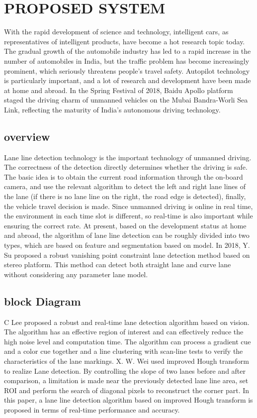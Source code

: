 \documentclass[oneside,a4paper,12pt]{report}
\begin{document}
\chapter{PROPOSED SYSTEM}
With the rapid development of science and technology, intelligent cars, as representatives of intelligent products, have become a hot research topic today. The gradual growth of the automobile industry has led to a rapid increase in the number of automobiles in India, but the traffic problem has become increasingly prominent, which seriously threatens people's travel safety. Autopilot technology is particularly important, and a lot of research and development have been made at home and abroad. In the Spring Festival of 2018, Baidu Apollo platform staged the driving charm of unmanned vehicles on the Mubai Bandra-Worli Sea Link, reflecting the maturity of India’s autonomous driving technology.  \\ 
\section{overview}
\hspace*{0.3 in}Lane line detection technology is the important technology of unmanned driving. The correctness of the detection directly determines whether the driving is safe. The basic idea is to obtain the current road information through the on-board camera, and use the relevant algorithm to detect the left and right lane lines of the lane (if there is no lane line on the right, the road edge is detected), finally, the vehicle travel decision is made. Since unmanned driving is online in real time, the environment in each time slot is different, so real-time is also important while ensuring the correct rate. At present, based on the development status at home and abroad, the algorithm of lane line detection can be roughly divided into two types, which are based on feature and segmentation based on model. In 2018, Y. Su proposed a robust vanishing point constraint lane detection method based on stereo platform. This method can detect both straight lane and curve lane without considering any parameter lane model. \\
\section{block Diagram}
\hspace*{0.3 in}C Lee proposed a robust and real-time lane detection algorithm based on vision. The algorithm has an effective region of interest and can effectively reduce the high noise level and computation time. The algorithm can process a gradient cue and a color cue together and a line clustering with scan-line tests to verify the characteristics of the lane markings. X. W. Wei used improved Hough transform to realize Lane detection. By controlling the slope of two lanes before and after comparison, a limitation is made near the previously detected lane line area, set ROI and perform the search of diagonal pixels to reconstruct the corner part. In this paper, a lane line detection algorithm based on improved Hough transform is proposed in terms of real-time performance and accuracy. \\
\end{document}
